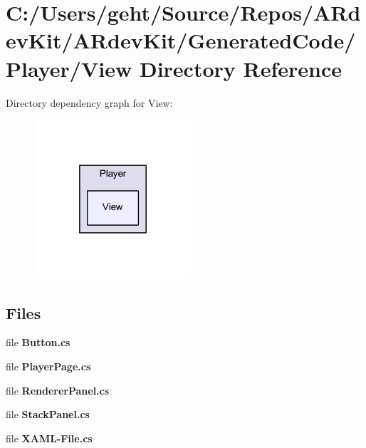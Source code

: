 \section{C\-:/\-Users/geht/\-Source/\-Repos/\-A\-Rdev\-Kit/\-A\-Rdev\-Kit/\-Generated\-Code/\-Player/\-View Directory Reference}
\label{dir_92042a10848ad8cb4c5efc0e43e0c5c7}
Directory dependency graph for View\-:
\nopagebreak
\begin{figure}[H]
\begin{center}
\leavevmode
\includegraphics[width=166pt]{dir_92042a10848ad8cb4c5efc0e43e0c5c7_dep}
\end{center}
\end{figure}
\subsection*{Files}
\begin{DoxyCompactItemize}
\item 
file {\bfseries Button.\-cs}
\item 
file {\bfseries Player\-Page.\-cs}
\item 
file {\bfseries Renderer\-Panel.\-cs}
\item 
file {\bfseries Stack\-Panel.\-cs}
\item 
file {\bfseries X\-A\-M\-L-\/\-File.\-cs}
\end{DoxyCompactItemize}
